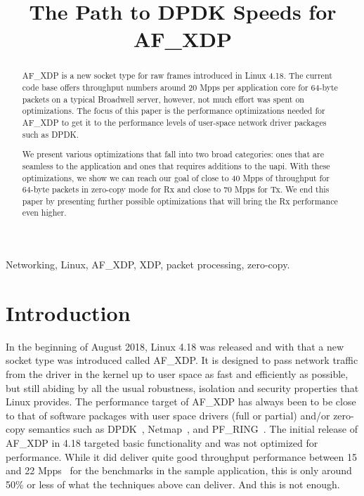 \documentclass[9pt,numbers,reprint]{sigplanconf}
\title{The Path to DPDK Speeds for AF\_XDP}
\begin{document}
\makeatletter
\def\@copyrightspace{\relax}
\makeatother

\maketitle

\begin{abstract}
AF\_XDP is a new socket type for raw frames introduced in Linux
4.18. The current code base offers throughput numbers around 20 Mpps
per application core for 64-byte packets on a typical Broadwell
server, however, not much effort was spent on optimizations. The focus
of this paper is the performance optimizations needed for AF\_XDP to
get it to the performance levels of user-space network driver packages
such as DPDK.

We present various optimizations that fall into two broad categories:
ones that are seamless to the application and ones that requires
additions to the uapi. With these optimizations, we show we can reach
our goal of close to 40 Mpps of throughput for 64-byte packets in
zero-copy mode for Rx and close to 70 Mpps for Tx. We end this paper
by presenting further possible optimizations that will bring the Rx
performance even higher.
\end{abstract}

\keywords
Networking, Linux, AF\_XDP, XDP, packet processing, zero-copy.

\section{Introduction}
In the beginning of August 2018, Linux 4.18 was released and with that
a new socket type was introduced called AF\_XDP. It is designed to
pass network traffic from the driver in the kernel up to user space as
fast and efficiently as possible, but still abiding by all the usual
robustness, isolation and security properties that Linux provides. The
performance target of AF\_XDP has always been to be close to that of
software packages with user space drivers (full or partial) and/or
zero-copy semantics such as DPDK~\cite{dpdk}, Netmap~\cite{netmap},
and PF\_RING~\cite{pfring}. The initial release of AF\_XDP in 4.18
targeted basic functionality and was not optimized for
performance. While it did deliver quite good throughput performance
between 15 and 22 Mpps~\cite{af_xdp_patch, af_xdp_patch_zc,
  af_xdp_patch_i40e, af_xdp_lwn} for the benchmarks in the sample
application, this is only around 50\% or less of what the techniques
above can deliver. And this is not enough.
\end{document}

